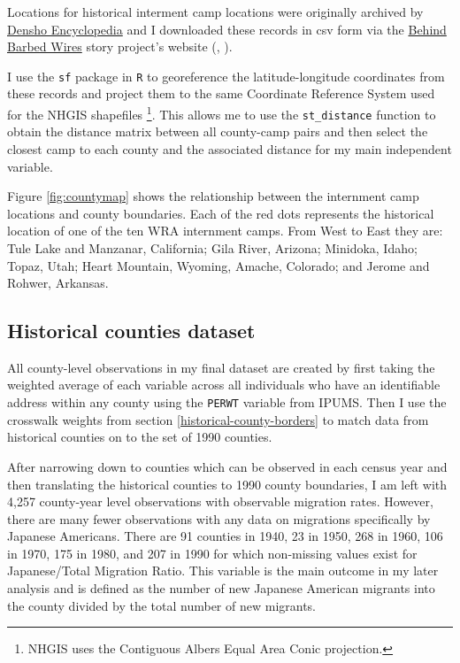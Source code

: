 \documentclass[12pt]{article}
\begin{document}
Locations for historical interment camp locations were originally archived by
\href{http://encyclopedia.densho.org/War_Relocation_Authority/\#Planning_the_Camps}{Densho
Encyclopedia} and I downloaded these records in csv form via the
\href{https://www.arcgis.com/home/item.html?id=69183af8d45d4f46a9dc4eba99440891}{Behind
Barbed Wires} story project's website
(\cite{chrkan_behind_2019}, \cite{robinson_war_2023}).

I use the \texttt{sf} package in \texttt{R} to georeference the latitude-longitude coordinates from these records and project them to the same Coordinate Reference System used for the NHGIS shapefiles \citep{pebesma_simple_2018} \footnote{NHGIS uses the Contiguous Albers Equal Area Conic projection.}.
This allows me to use the \texttt{st\_distance} function to obtain the distance matrix between all county-camp pairs and then select the closest camp to each county and the associated distance for my main independent variable.

Figure \ref{fig:countymap} shows the relationship between the internment camp locations and county boundaries. 
Each of the red dots represents the historical location of one of the ten WRA internment camps. 
From West to East they are:
Tule Lake and Manzanar, California;
Gila River, Arizona;
Minidoka, Idaho;
Topaz, Utah;
Heart Mountain, Wyoming,
Amache, Colorado;
and
Jerome and Rohwer, Arkansas.

\subsection{Historical counties
dataset}\label{historical-counties-dataset}

All county-level observations in my final dataset are created by first taking the weighted average of each variable across all individuals who have an identifiable address within any county 
using the \texttt{PERWT} variable from IPUMS. 
Then I use the crosswalk weights from section \ref{historical-county-borders} to match data from historical counties on to the set of 1990 counties. 

After narrowing down to counties which can be observed in each census
year and then translating the historical counties to 1990 county
boundaries, I am left with 4,257 county-year level observations with observable migration rates.
However, there are many fewer observations with any data on migrations specifically by Japanese Americans.
There are 91 counties in 1940, 23 in 1950, 268 in 1960, 106 in 1970, 175 in 1980, and 207 in 1990 for which non-missing values exist for Japanese/Total Migration Ratio.
This variable is the main outcome in my later analysis and is defined as the number of new Japanese American migrants into the county divided by the total number of new migrants.
\end{document}
